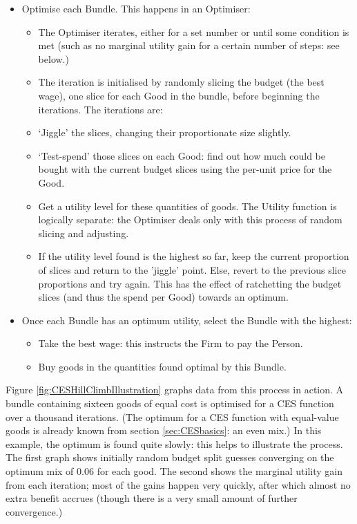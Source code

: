 \begin{itemize}
	\item Optimise each Bundle. This happens in an Optimiser:
	\begin{itemize}
	\item The Optimiser iterates, either for a set number or until some condition is met (such as no marginal utility gain for a certain number of steps: see below.) 
	\item The iteration is initialised by randomly slicing the budget (the best wage), one slice for each Good in the bundle, before beginning the iterations. The iterations are:
	\item `Jiggle' the slices, changing their proportionate size slightly.
	\item `Test-spend' those slices on each Good: find out how much could be bought with the current budget slices using the per-unit price for the Good.
	\item Get a utility level for these quantities of goods. The Utility function is logically separate: the Optimiser deals only with this process of random slicing and adjusting.
	\item If the utility level found is the highest so far, keep the current proportion of slices and return to the 'jiggle' point. Else, revert to the previous slice proportions and try again. This has the effect of ratchetting the budget slices (and thus the spend per Good) towards an optimum.
	\end{itemize}
	\item Once each Bundle has an optimum utility, select the Bundle with the highest:
	\begin{itemize}
	\item Take the best wage: this instructs the Firm to pay the Person.
	\item Buy goods in the quantities found optimal by this Bundle.
	\end{itemize}
\end{itemize}

Figure \ref{fig:CESHillClimbIllustration} graphs data from this process in action. A bundle containing sixteen goods of equal cost is optimised for a CES function over a thousand iterations. (The optimum for a CES function with equal-value goods is  already known from section \ref{sec:CESbasics}: an even mix.) In this example, the optimum is found quite slowly: this helps to illustrate the process. The first graph shows initially random budget split guesses converging on the optimum mix of $0.06$ for each good. The second shows the marginal utility gain from each iteration; most of the gains happen very quickly, after which almost no extra benefit accrues (though there is a very small amount of further convergence.)

